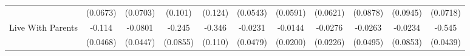 {\begin{tabular}{l*{10}{c}}
            &    (0.0673)         &    (0.0703)         &     (0.101)         &     (0.124)         &    (0.0543)         &    (0.0591)         &    (0.0621)         &    (0.0878)         &    (0.0945)         &    (0.0718)         \\
\addlinespace
Live With Parents&      -0.114\sym{*}  &     -0.0801         &      -0.245\sym{**} &      -0.346\sym{**} &     -0.0231         &     -0.0144         &     -0.0276         &     -0.0263         &     -0.0234         &      -0.545\sym{***}\\
            &    (0.0468)         &    (0.0447)         &    (0.0855)         &     (0.110)         &    (0.0479)         &    (0.0200)         &    (0.0226)         &    (0.0495)         &    (0.0853)         &    (0.0439)         \\
\bottomrule
\end{tabular}
}
